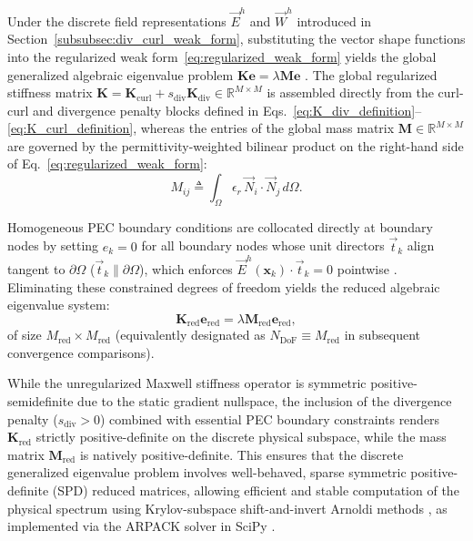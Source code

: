 \documentclass[preprint,12pt]{elsarticle}
\begin{document}
Under the discrete field representations $\vec{E}^h$ and $\vec{W}^h$ introduced in Section~\ref{subsubsec:div_curl_weak_form}, substituting the vector shape functions into the regularized weak form~\eqref{eq:regularized_weak_form} yields the global generalized algebraic eigenvalue problem $\mathbf{K} \mathbf{e} = \lambda \mathbf{M} \mathbf{e}$ \cite{ortiz2023tese, goncalves2025tese}. The global regularized stiffness matrix $\mathbf{K} = \mathbf{K}_{\mathrm{curl}} + s_{\mathrm{div}} \mathbf{K}_{\mathrm{div}} \in \mathbb{R}^{M \times M}$ is assembled directly from the curl-curl and divergence penalty blocks defined in Eqs.~\eqref{eq:K_div_definition}--\eqref{eq:K_curl_definition}, whereas the entries of the global mass matrix $\mathbf{M} \in \mathbb{R}^{M \times M}$ are governed by the permittivity-weighted bilinear product on the right-hand side of Eq.~\eqref{eq:regularized_weak_form}:
\begin{equation}
    M_{ij} \triangleq \int_{\Omega} \epsilon_r \, \vec{N}_i \cdot \vec{N}_j \, d\Omega.
    \label{eq:mass_matrix_entry}
\end{equation}

Homogeneous PEC boundary conditions are collocated directly at boundary nodes by setting $e_k = 0$ for all boundary nodes whose unit directors $\vec{t}_k$ align tangent to $\partial\Omega$ ($\vec{t}_k \parallel \partial\Omega$), which enforces $\vec{E}^h(\mathbf{x}_k) \cdot \vec{t}_k = 0$ pointwise \cite{ortiz2021nodal, goncalves2025tese}. Eliminating these constrained degrees of freedom yields the reduced algebraic eigenvalue system:
\begin{equation}
    \mathbf{K}_{\mathrm{red}} \mathbf{e}_{\mathrm{red}} = \lambda \mathbf{M}_{\mathrm{red}} \mathbf{e}_{\mathrm{red}},
    \label{eq:generalized_eigenvalue_system}
\end{equation}
of size $M_{\mathrm{red}} \times M_{\mathrm{red}}$ (equivalently designated as $N_{\mathrm{DoF}} \equiv M_{\mathrm{red}}$ in subsequent convergence comparisons).

While the unregularized Maxwell stiffness operator is symmetric positive-semidefinite due to the static gradient nullspace, the inclusion of the divergence penalty ($s_{\mathrm{div}} > 0$) combined with essential PEC boundary constraints renders $\mathbf{K}_{\mathrm{red}}$ strictly positive-definite on the discrete physical subspace, while the mass matrix $\mathbf{M}_{\mathrm{red}}$ is natively positive-definite. This ensures that the discrete generalized eigenvalue problem involves well-behaved, sparse symmetric positive-definite (SPD) reduced matrices, allowing efficient and stable computation of the physical spectrum using Krylov-subspace shift-and-invert Arnoldi methods \cite{saad2011numerical, lehoucq1998arpack}, as implemented via the ARPACK solver in SciPy \cite{virtanen2020scipy}.
\end{document}
